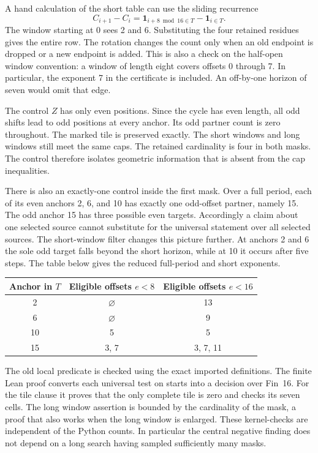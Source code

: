 \documentclass[12pt,letterpaper]{article}
\DeclareRobustCommand{\id}[1]{\mbox{\small\ttfamily #1}}
\begin{document}
A hand calculation of the short table can use the sliding recurrence
\[
 C_{i+1}-C_i=\mathbf1_{i+8\bmod16\in T}-\mathbf1_{i\in T}.
\]
The window starting at 0 sees 2 and 6. Substituting the four retained residues gives the entire row. The rotation changes the count only when an old endpoint is dropped or a new endpoint is added. This is also a check on the half-open window convention: a window of length eight covers offsets 0 through 7. In particular, the exponent 7 in the certificate is included. An off-by-one horizon of seven would omit that edge.

The control $Z$ has only even positions. Since the cycle has even length, all odd shifts lead to odd positions at every anchor. Its odd partner count is zero throughout. The marked tile is preserved exactly. The short windows and long windows still meet the same caps. The retained cardinality is four in both masks. The control therefore isolates geometric information that is absent from the cap inequalities.

There is also an exactly-one control inside the first mask. Over a full period, each of its even anchors 2, 6, and 10 has exactly one odd-offset partner, namely 15. The odd anchor 15 has three possible even targets. Accordingly a claim about one selected source cannot substitute for the universal statement over all selected sources. The short-window filter changes this picture further. At anchors 2 and 6 the sole odd target falls beyond the short horizon, while at 10 it occurs after five steps. The table below gives the reduced full-period and short exponents.
\begin{center}
\begin{tabular}{@{}ccc@{}}
\toprule
Anchor in $T$ & Eligible offsets $e<8$ & Eligible offsets $e<16$\\
\midrule
2 & $\varnothing$ & 13\\
6 & $\varnothing$ & 9\\
10 & 5 & 5\\
15 & 3, 7 & 3, 7, 11\\
\bottomrule
\end{tabular}
\end{center}

The old local predicate is checked using the exact imported definitions. The finite Lean proof converts each universal test on starts into a decision over \id{Fin 16}. For the tile clause it proves that the only complete tile is zero and checks its seven cells. The long window assertion is bounded by the cardinality of the mask, a proof that also works when the long window is enlarged. These kernel-checks are independent of the Python counts. In particular the central negative finding does not depend on a long search having sampled sufficiently many masks.
\end{document}
